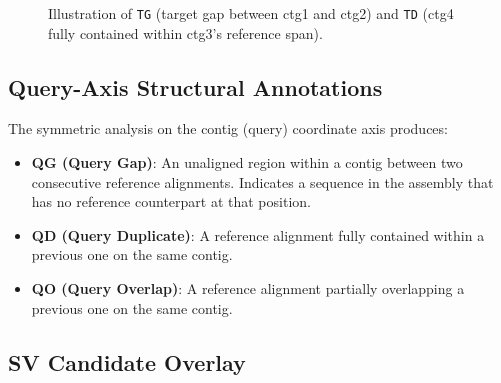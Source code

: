 \documentclass[11pt,a4paper]{article}
\begin{document}
\begin{figure}[h]
\centering
{}
\caption{Illustration of \texttt{TG} (target gap between ctg1 and ctg2)
         and \texttt{TD} (ctg4 fully contained within ctg3's reference span).}
\end{figure}

\subsection{Query-Axis Structural Annotations}

The symmetric analysis on the contig (query) coordinate axis produces:

\begin{itemize}
  \item \textbf{QG (Query Gap)}: An unaligned region within a contig between
        two consecutive reference alignments.
        Indicates a sequence in the assembly that has no reference counterpart
        at that position.
  \item \textbf{QD (Query Duplicate)}: A reference alignment fully contained
        within a previous one on the same contig.
  \item \textbf{QO (Query Overlap)}: A reference alignment partially overlapping
        a previous one on the same contig.
\end{itemize}

\subsection{SV Candidate Overlay}
\end{document}
